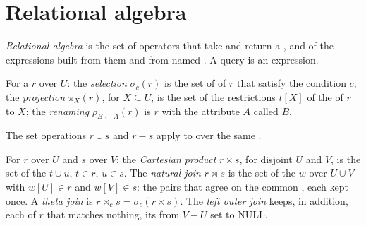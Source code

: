 \section{Relational algebra}\label{sec:b1:relational-model:algebra}

\begin{definition}\label{def:b1:relational-model:algebra}
\emph{Relational algebra} is the set of operators that take  and return a ,
and of the expressions built from them and from named . A query is an expression.
\end{definition}

\begin{definition}\label{def:b1:relational-model:selection}
For a  $r$ over  $U$: the \emph{selection} $\sigma_c(r)$ is the set
of  of $r$ that satisfy the condition $c$; the \emph{projection}
$\pi_X(r)$, for $X \subseteq U$, is the set of the restrictions $t[X]$ of the  of $r$ to $X$; the
\emph{renaming} $\rho_{B \leftarrow A}(r)$ is $r$ with the attribute $A$ called $B$.
\end{definition}

The set operations $r \cup s$ and $r - s$ apply to  over the same .

\begin{definition}\label{def:b1:relational-model:join}
For $r$ over $U$ and $s$ over $V$:
the \emph{Cartesian product} $r \times s$, for disjoint $U$ and $V$, is the set
of the  $t \cup u$, $t \in r$, $u \in s$. The \emph{natural join} $r \bowtie s$ is the set of the
 $w$ over $U \cup V$ with $w[U] \in r$ and $w[V] \in s$: the pairs that agree on the common , each kept
once. A \emph{theta join} is $r \bowtie_c s = \sigma_c(r \times s)$. The \emph{left outer
join} keeps, in addition, each  of $r$ that matches nothing, its  from $V - U$ set to
NULL.
\end{definition}

